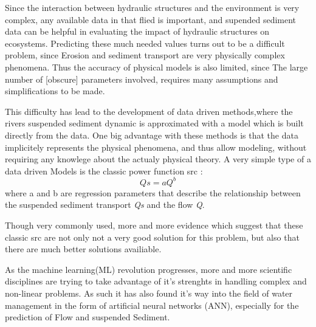 Since the interaction between hydraulic structures and the environment is very complex, any available data in that flied is important, and supended sediment data can be helpful in evaluating the impact of hydraulic structures on ecosystems.
Predicting these much needed values turns out to be a difficult problem, since Erosion and sediment transport are very physically complex phenomena. Thus the accuracy of physical models is also limited, since The large number of [obscure] parameters involved, requires many assumptions and simplifications to be made.

This difficulty has lead to the development of data driven methods,where the rivers suspended sediment dynamic is approximated with a model which is built directly from the data. One big advantage with these methods is that the data implicitely represents the physical phenomena, and thus allow modeling, without requiring any knowlege about the actualy physical theory. 
A very simple type of a data driven Models is the classic power function \gls{src} \cite{Jansson}:
\begin{equation}\label{eq:emc}
Qs=aQ^{b}
\end{equation}   
where a and b are regression parameters that describe the relationship between the suspended sediment transport \textit{Qs} and the flow \textit{Q}.\cite{afan2016past}

 Though very commonly used, more and more evidence which suggest that these classic \gls{src} are not only not a very good solution for this problem, but also that there are much better solutions availiable. \cite{past}




As the machine learning(ML) revolution progresses, more and more scientific disciplines are trying to take advantage of it's strenghts in handling complex and non-linear problems. As such it has also found it's way into the field of water management in the form of artificial neural networks (ANN), especially for the prediction of Flow and suspended Sediment.



